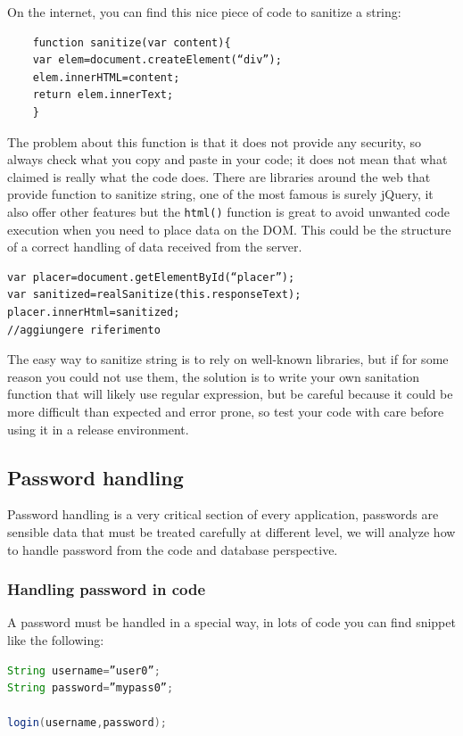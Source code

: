 On the internet, you can find this nice piece of code to sanitize a string:
\begin{lstlisting}
	function sanitize(var content){
	var elem=document.createElement(“div”);
	elem.innerHTML=content;
	return elem.innerText;
	}
\end{lstlisting}


The problem about this function is that it does not provide any security, so always check what you copy and paste in your code; it does not mean that what claimed is really what the code does.\newline
There are libraries around the web that provide function to sanitize string, one of the most famous is surely jQuery, it also offer other features but the \texttt{html()} function is great to avoid unwanted code execution when you need to place data on the DOM.\newline
This could be the structure of a correct handling of data received from the server.\newline
\begin{lstlisting}
var placer=document.getElementById(“placer”);
var sanitized=realSanitize(this.responseText);
placer.innerHtml=sanitized;
//aggiungere riferimento
\end{lstlisting}
The easy way to sanitize string is to rely on well-known libraries, but if for some reason you could not use them, the solution is to write your own sanitation function that will likely use regular expression, but be careful because it could be more difficult than expected and error prone, so test your code with care before using it in a release environment.\newline

\subsection{Password handling}
Password handling is a very critical section of every application, passwords are sensible data that must be treated carefully at different level, we will analyze how to handle password from the code and database perspective.\newline

\subsubsection{Handling password in code}
A password must be handled in a special way, in lots of code you can find snippet like the following:
\begin{lstlisting}[language=java]
String username=”user0”;
String password=”mypass0”;

login(username,password);
\end{lstlisting}

